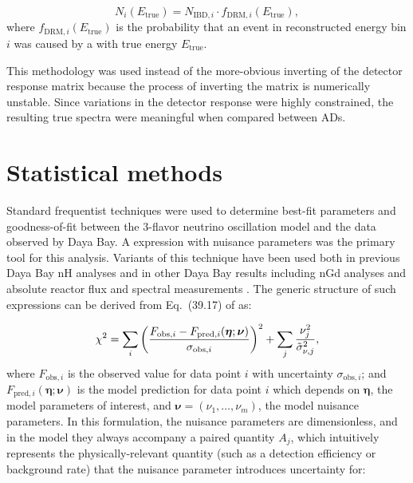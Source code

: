 \begin{equation}
    N_i(E_{\text{true}}) = N_{\text{IBD},i} \cdot f_{\text{DRM},i}(E_{\text{true}}),
\end{equation}
where $f_{\text{DRM},i}(E_{\text{true}})$ is the probability
that an event in reconstructed energy bin $i$
was caused by a \nuebar{} with true energy $E_{\text{true}}$.

This methodology was used instead of the more-obvious
inverting of the detector response matrix
because the process of inverting the matrix is numerically unstable.
Since variations in the detector response were highly constrained,
the resulting true \nuebar{} spectra were meaningful when compared between ADs.


\begin{figure}
    \label{fig:drm}
\end{figure}










\section{Statistical methods}
\label{sec:fitter}

Standard frequentist techniques were used to determine best-fit parameters
and goodness-of-fit between the 3-flavor neutrino oscillation model
and the data observed by Daya Bay.
A \chisquare{} expression with nuisance parameters
was the primary tool for this analysis.
Variants of this technique have been used both in previous Daya Bay nH analyses
and in other Daya Bay results including nGd \thetaot{} analyses
and absolute reactor \nuebar{} flux and spectral measurements
\cite{nh2016,ngd2016,reactorflux2017,extractionreactorflux2019}.
The generic structure of such \chisquare{} expressions
can be derived from Eq.~(39.17) of \cite{pdg} as:

\begin{equation}
    \label{eq:chisquare_generic}
    \chi^2 = \sum_i \left(
        \frac{F_{\text{obs},i} - F_{\text{pred},i}(\boldsymbol{\eta};\boldsymbol{\nu})}
            {\sigma_{\text{obs},i}}
        \right)^2
        +
        \sum_j \frac{\nu_j^2}{\tilde{\sigma}_{\nu,j}^2},
\end{equation}
where $F_{\text{obs},i}$ is the observed value for data point $i$
with uncertainty $\sigma_{\text{obs},i}$;
and $F_{\text{pred},i}(\boldsymbol{\eta};\boldsymbol{\nu})$
is the model prediction for data point $i$
which depends on $\boldsymbol{\eta}$, the model parameters of interest,
and $\boldsymbol{\nu}=(\nu_1, \ldots, \nu_m)$,
the model nuisance parameters.
In this formulation, the nuisance parameters are dimensionless,
and in the model they always accompany a paired quantity $A_j$,
which intuitively represents the physically-relevant quantity
(such as a detection efficiency or background rate)
that the nuisance parameter introduces uncertainty for:

